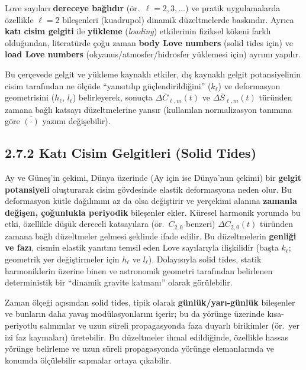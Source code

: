Love sayıları \textbf{dereceye bağlıdır} (ör.\ $\ell=2,3,\dots$) ve pratik uygulamalarda özellikle
$\ell=2$ bileşenleri (kuadrupol) dinamik düzeltmelerde baskındır.
Ayrıca \textbf{katı cisim gelgiti} ile \textbf{yükleme} (\emph{loading}) etkilerinin fiziksel kökeni farklı olduğundan,
literatürde çoğu zaman \textbf{body Love numbers} (solid tides için) ve \textbf{load Love numbers} (okyanus/atmosfer/hidrosfer yüklemesi için) ayrımı yapılır.

Bu çerçevede gelgit ve yükleme kaynaklı etkiler,
dış kaynaklı gelgit potansiyelinin cisim tarafından ne ölçüde ``yansıtılıp güçlendirildiğini''
($k_{\ell}$) ve deformasyon geometrisini ($h_{\ell}$, $l_{\ell}$) belirleyerek, sonuçta
$\Delta \bar{C}_{\ell,m}(t)$ ve $\Delta \bar{S}_{\ell,m}(t)$ türünden
zamana bağlı katsayı düzeltmelerine yansır (kullanılan normalizasyon tanımına göre $\bar{(\cdot)}$ yazımı değişebilir).

\subsection*{2.7.2 \hspace{0.25em} Katı Cisim Gelgitleri (Solid Tides)}
\label{subsec:solid_tides}

Ay ve Güneş'in çekimi, Dünya üzerinde (Ay için ise Dünya'nun çekimi) bir \textbf{gelgit potansiyeli} oluşturarak
cisim gövdesinde elastik deformasyona neden olur. Bu deformasyon kütle dağılımını az da olsa değiştirir ve
yerçekimi alanına \textbf{zamanla değişen, çoğunlukla periyodik} bileşenler ekler.
Küresel harmonik yorumda bu etki, özellikle düşük dereceli katsayılara (ör.\ $C_{2,0}$ benzeri)
$\Delta C_{2,0}(t)$ türünden zamana bağlı düzeltmeler gelmesi şeklinde ifade edilir.
Bu düzeltmelerin \textbf{genliği ve fazı}, cismin elastik yanıtını temsil eden Love sayılarıyla ilişkilidir
(başta $k_{\ell}$; geometrik yer değiştirmeler için $h_{\ell}$ ve $l_{\ell}$).
Dolayısıyla solid tides, statik harmoniklerin üzerine binen ve astronomik geometri tarafından belirlenen
deterministik bir ``dinamik gravite katmanı'' olarak görülebilir.

Zaman ölçeği açısından solid tides, tipik olarak \textbf{günlük/yarı-günlük} bileşenler ve bunların daha yavaş
modülasyonlarını içerir; bu da yörünge üzerinde kısa-periyotlu salınımlar ve uzun süreli propagasyonda
faza duyarlı birikimler (ör.\ yer izi faz kaymaları) üretebilir.
Bu düzeltmeler ihmal edildiğinde, özellikle hassas yörünge belirleme ve uzun süreli propagasyonda
yörünge elemanlarında ve konumda ölçülebilir sapmalar ortaya çıkabilir.


